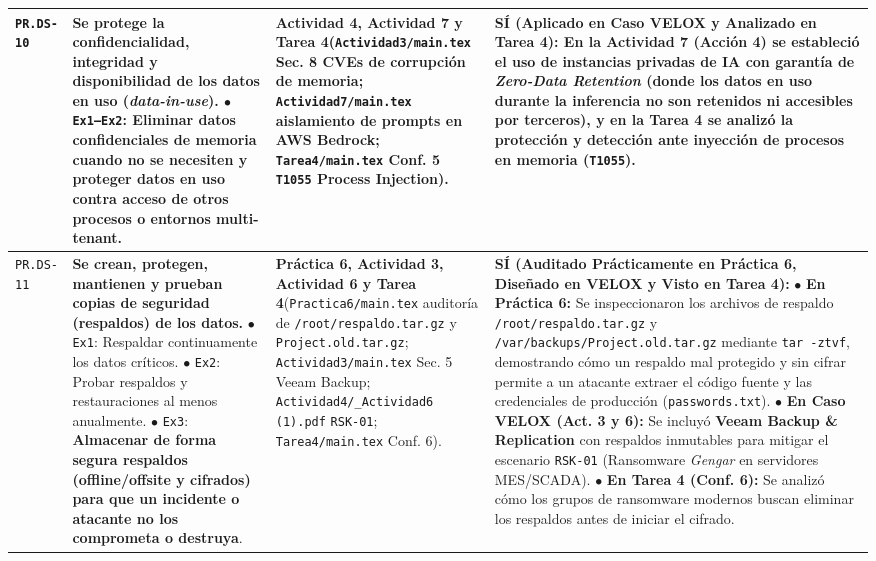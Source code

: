 \documentclass[letterpaper,11pt]{article}
\begin{document}
\begin{longtable}{|C{1.5cm}|L{5.3cm}|L{4.3cm}|L{5.8cm}|}
\texttt{PR.DS-10} &
\textbf{Se protege la confidencialidad, integridad y disponibilidad de los datos en uso (\textit{data-in-use}).}\newline
$\bullet$ \texttt{Ex1--Ex2}: Eliminar datos confidenciales de memoria cuando no se necesiten y proteger datos en uso contra acceso de otros procesos o entornos multi-tenant. &
\textbf{Actividad 4, Actividad 7 y Tarea 4}\newline (\texttt{Actividad3/main.tex} Sec. 8 CVEs de corrupción de memoria; \texttt{Actividad7/main.tex} aislamiento de prompts en AWS Bedrock; \texttt{Tarea4/main.tex} Conf. 5 \texttt{T1055} Process Injection). &
\textbf{SÍ (Aplicado en Caso VELOX y Analizado en Tarea 4):}\newline
En la Actividad 7 (Acción 4) se estableció el uso de instancias privadas de IA con garantía de \textit{Zero-Data Retention} (donde los datos en uso durante la inferencia no son retenidos ni accesibles por terceros), y en la Tarea 4 se analizó la protección y detección ante inyección de procesos en memoria (\texttt{T1055}). \\
\hline

\texttt{PR.DS-11} &
\textbf{Se crean, protegen, mantienen y prueban copias de seguridad (respaldos) de los datos.}\newline
$\bullet$ \texttt{Ex1}: Respaldar continuamente los datos críticos.\newline
$\bullet$ \texttt{Ex2}: Probar respaldos y restauraciones al menos anualmente.\newline
$\bullet$ \texttt{Ex3}: \textbf{Almacenar de forma segura respaldos (offline/offsite y cifrados) para que un incidente o atacante no los comprometa o destruya}. &
\textbf{Práctica 6, Actividad 3, Actividad 6 y Tarea 4}\newline (\texttt{Practica6/main.tex} auditoría de \texttt{/root/respaldo.tar.gz} y \texttt{Project.old.tar.gz}; \texttt{Actividad3/main.tex} Sec. 5 Veeam Backup; \texttt{Actividad4/\_Actividad6 (1).pdf} \texttt{RSK-01}; \texttt{Tarea4/main.tex} Conf. 6). &
\textbf{SÍ (Auditado Prácticamente en Práctica 6, Diseñado en VELOX y Visto en Tarea 4):}\newline
$\bullet$ \textbf{En Práctica 6:} Se inspeccionaron los archivos de respaldo \texttt{/root/respaldo.tar.gz} y \texttt{/var/backups/Project.old.tar.gz} mediante \texttt{tar -ztvf}, demostrando cómo un respaldo mal protegido y sin cifrar permite a un atacante extraer el código fuente y las credenciales de producción (\texttt{passwords.txt}).\newline
$\bullet$ \textbf{En Caso VELOX (Act. 3 y 6):} Se incluyó \textbf{Veeam Backup \& Replication} con respaldos inmutables para mitigar el escenario \texttt{RSK-01} (Ransomware \textit{Gengar} en servidores MES/SCADA).\newline
$\bullet$ \textbf{En Tarea 4 (Conf. 6):} Se analizó cómo los grupos de ransomware modernos buscan eliminar los respaldos antes de iniciar el cifrado. \\
\hline


\end{longtable}
\end{document}

